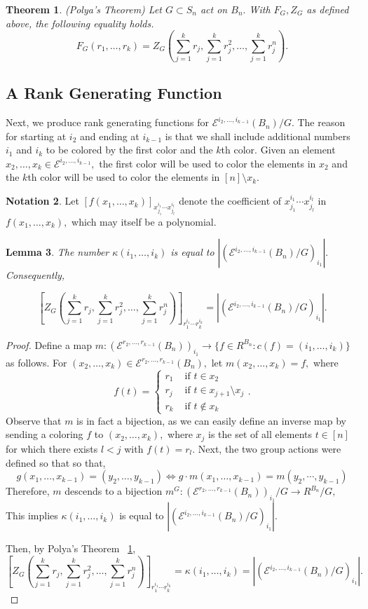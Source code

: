 \documentclass[10 pt]{amsart}
\theoremstyle{plain}
\newtheorem{thm}{Theorem}[section]
\newtheorem{lem}[thm]{Lemma}
\theoremstyle{definition}
\newtheorem{note}[thm]{Notation}
\theoremstyle{remark}
\numberwithin{equation}{section}
\newcommand\ssec{\subsection}
\renewcommand{\iff}{\Leftrightarrow}
\begin{document}
\begin{thm}
\label{thm:polya}
(Polya's Theorem)
 Let $G \subset S_n$ act on $B_n.$ With $F_G,Z_G$ as defined above, the following equality holds.
$$F_G(r_1,\ldots, r_k) = Z_G\left(\sum_{j=1}^k r_j,\sum_{j=1}^k r_j^2,\ldots, \sum_{j=1}^k r_j^n\right).$$
\end{thm}


\ssec{A Rank Generating Function}
Next, we produce rank generating functions for $\mathcal E^{i_2,\ldots,i_{k-1}}(B_n)/G.$ The reason for starting at $i_2$ and ending at $i_{k-1}$ is that we shall include additional numbers $i_1$ and $i_k$ to be colored by the first color and the $k$th color. Given an element $x_2,\ldots,x_k \in \mathcal E^{i_2,\ldots, i_{k-1}},$ the first color will be used to color the elements in $x_2$ and the $k$th color will be used to color the elements in $[n]\setminus x_k.$

\begin{note}
Let $[f(x_1,\ldots, x_k)]_{x_{j_1}^{i_1}\cdots x_{j_l}^{i_l}}$ denote the coefficient of $x_{j_1}^{i_1}\cdots x_{j_l}^{i_l}$ in $f(x_1,\ldots, x_k),$ which may itself be a polynomial.
\end{note}

\begin{lem}
\label{lem:polya_faces_equivlence}
The number $\kappa(i_1,\ldots, i_k)$ is equal to $|(\mathcal E^{i_2,\ldots, i_{k-1}}(B_n)/G)_{i_1}|.$ Consequently, 

$$\left[Z_G \left(\sum_{j=1}^k r_j,\sum_{j=1}^k r_j^2,\ldots, \sum_{j=1}^k r_j^n \right)\right]_{r_1^{i_1} \cdots r_k^{i_k}}=|(\mathcal E^{i_2,\ldots, i_{k-1}}(B_n)/G)_{i_1}|.$$
\end{lem}
\begin{proof}
Define a map $m:(\mathcal E^{r_2,\ldots, r_{k-1}}(B_n))_{i_1} \rightarrow \{f \in R^{B_n}:c(f) =(i_1,\ldots, i_k)\}$ as follows. For $(x_2,\ldots, x_{k}) \in \mathcal E^{r_2,\ldots, r_{k-1}}(B_n),$ let $m(x_2,\ldots, x_{k}) = f,$ where 
$$f(t) = \begin{cases} r_1 &\text{ if } t\in x_2\\
r_j &\text{ if } t \in x_{j+1}\setminus x_j\\
r_k &\text{ if } t \notin x_k
\end{cases}.$$
Observe that $m$ is in fact a bijection, as we can easily define an inverse map by sending a coloring $f$ to $(x_2,\ldots, x_{k}),$ where $x_j$ is the set of all elements $t \in [n]$ for which there exists $l < j$ with $f(t) = r_l.$
Next, the two group actions were defined so that so that, 
$$g(x_1,\ldots, x_{k-1}) = (y_2,\ldots, y_{k-1}) \iff g\cdot m(x_1,\ldots, x_{k-1}) = m(y_2, \cdots, y_{k-1})$$
Therefore, $m$ descends to a bijection $m^G:(\mathcal E^{r_2,\ldots, r_{k-1}}(B_n))_{i_1}/G \rightarrow R^{B_n}/G,$ This implies $\kappa(i_1,\ldots, i_k)$ is equal to $|(\mathcal E^{i_2,\ldots, i_{k-1}}(B_n)/G)_{i_1}|.$ 

Then, by Polya's Theorem ~\ref{thm:polya},  
$$\left[Z_G\left(\sum_{j=1}^k r_j,\sum_{j=1}^k r_j^2,\ldots, \sum_{j=1}^k r_j^n\right)\right]_{r_1^{i_1} \cdots r_k^{i_k}}=\kappa(i_1,\ldots, i_k)=|(\mathcal E^{i_2,\ldots, i_{k-1}}(B_n)/G)_{i_1}|.$$
\end{proof}
\end{document}
